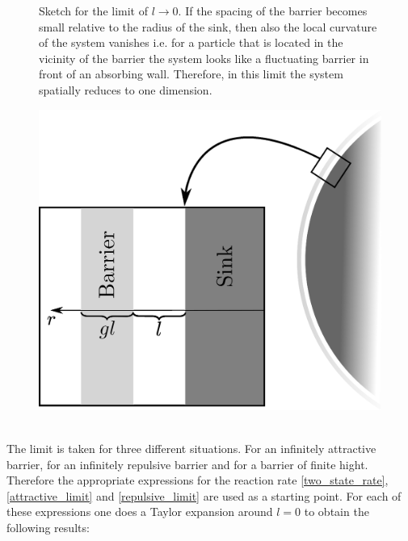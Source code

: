 \begin{minipage}[t]{.372 \textwidth}
    \vspace{0.5 cm}
    \begin{figure}[H]
        \caption{Sketch for the limit of $l\rightarrow 0$. If the spacing of the barrier becomes small relative to the radius of the sink, then also the local curvature of the system vanishes i.e. for a particle that is located in the vicinity of the barrier the system looks like a fluctuating barrier in front of an absorbing wall. Therefore, in this limit the system spatially reduces to one dimension.
    \label{fig:llimit_skizze}}
    \end{figure}
\end{minipage}\hspace{0.04 \textwidth}\begin{minipage}[t]{.608 \textwidth}
    \begin{figure}[H]
        \includegraphics[width = 1 \textwidth]{plots/tlimit.eps}
    \end{figure}
\end{minipage}
\vspace{0.5 cm} \\
The limit is taken for three different situations. For an infinitely attractive barrier, for an infinitely repulsive barrier and for a barrier of finite hight. Therefore the appropriate expressions for the reaction rate \eqref{two_state_rate}, \eqref{attractive_limit} and \eqref{repulsive_limit} are used as a starting point. For each of these expressions one does a Taylor expansion around $l=0$ to obtain the following results:
\begin{equation}
    
    \label{llimit_finite}
\end{equation}
\newpage
